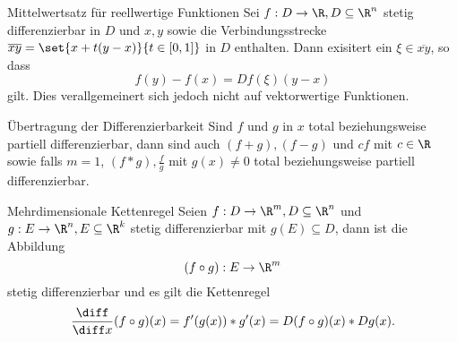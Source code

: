 \begin{satz}{Mittelwertsatz für reellwertige Funktionen}
	Sei $f:D\rightarrow\R,D\subseteq \R^n$ stetig differenzierbar in $D$ und $x,y$ sowie die Verbindungsstrecke $\overline{xy}=\set{x+t(y-x)}{t\in[0,1]}$ in $D$ enthalten. Dann exisitert ein $\xi\in\overline{xy}$, so dass
	\begin{equation*}
		f(y)-f(x)=Df(\xi)(y-x)
	\end{equation*}
	gilt. Dies verallgemeinert sich jedoch nicht auf vektorwertige Funktionen.
\end{satz}

\begin{satz}{Übertragung der Differenzierbarkeit}
	Sind $f$ und $g$ in $x$ total beziehungsweise partiell differenzierbar, dann sind auch $(f+g), (f-g)$ und $cf$ mit $c\in\R$ sowie falls $m=1$, $(f*g), \frac fg$ mit $g(x)\neq 0$ total beziehungsweise partiell differenzierbar.
\end{satz}

\begin{satz}{Mehrdimensionale Kettenregel}
	Seien $f:D\rightarrow\R^m,D\subseteq \R^n$ und $g:E\rightarrow\R^n,E\subseteq \R^k$ stetig differenzierbar mit $g(E)\subseteq D$, dann ist die Abbildung
	\begin{equation*}
		(f\circ g):E\rightarrow \R^m
	\end{equation*}
	stetig differenzierbar und es gilt die Kettenregel
	\begin{equation*}
		\frac{\diff}{\diff x}(f\circ g)(x)=f'(g(x))*g'(x)=D(f\circ g)(x)*Dg(x).
	\end{equation*}
\end{satz}
